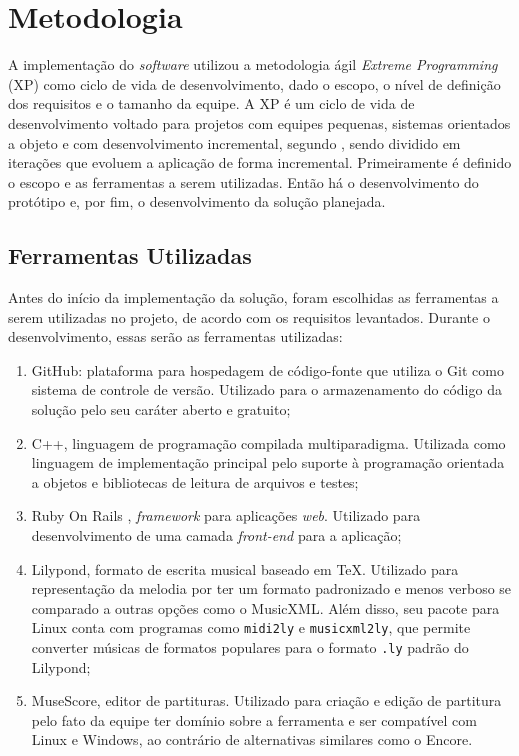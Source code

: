 \chapter[Metodologia]{Metodologia} \label{c2}

  A implementação do \textit{software} utilizou a metodologia ágil \textit{Extreme Programming} (XP) como ciclo de vida de desenvolvimento, dado o escopo, o nível de definição dos requisitos e o tamanho da equipe. A XP é um ciclo de vida de desenvolvimento voltado para projetos com equipes pequenas, sistemas orientados a objeto e com desenvolvimento incremental, segundo , sendo dividido em iterações que evoluem a aplicação de forma incremental. Primeiramente é definido o escopo e as ferramentas a serem utilizadas. Então há o desenvolvimento do protótipo e, por fim, o desenvolvimento da solução planejada.

  \section[Ferramentas Utilizadas]{Ferramentas Utilizadas}

    Antes do início da implementação da solução, foram escolhidas as ferramentas a serem utilizadas no projeto, de acordo com os requisitos levantados. Durante o desenvolvimento, essas serão as ferramentas utilizadas:

  \begin{enumerate}
    \item GitHub\footnotemark {}: plataforma para hospedagem de código-fonte que utiliza o Git como sistema de controle de versão. Utilizado para o armazenamento do código da solução pelo seu caráter aberto e gratuito;
    \item C++\footnotemark {}, linguagem de programação compilada multiparadigma. Utilizada como linguagem de implementação principal pelo suporte à programação orientada a objetos e bibliotecas de leitura de arquivos e testes;
    \item Ruby On Rails \footnotemark {}, \textit{framework} para aplicações \textit{web}. Utilizado para desenvolvimento de uma camada \textit{front-end} para a aplicação;
    \item Lilypond\footnotemark {}, formato de escrita musical baseado em TeX. Utilizado para representação da melodia por ter um formato padronizado e menos verboso se comparado a outras opções como o MusicXML. Além disso, seu pacote para Linux conta com programas como \lstinline{midi2ly} e \lstinline{musicxml2ly}, que permite converter músicas de formatos populares para o formato \lstinline{.ly} padrão do Lilypond;
    \item MuseScore\footnotemark {}, editor de partituras. Utilizado para criação e edição de partitura pelo fato da equipe ter domínio sobre a ferramenta e ser compatível com Linux e Windows, ao contrário de alternativas similares como o Encore.
  \end{enumerate}

